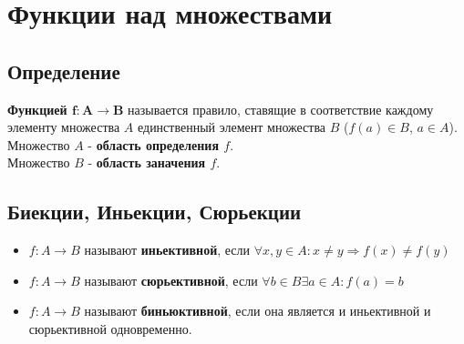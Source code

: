           
\chapter{Функции над множествами}
\section{Определение}
\textbf{Функцией $\mathbf{f : A \rightarrow B}$} называется правило, ставящие в соответствие каждому элементу множества $A$ единственный элемент множества $B$ ($f(a) \in B$, $a \in A$).\\
Множество $A$ - \textbf{область определения $f$}.\\
Множество $B$ - \textbf{область заначения $f$}.\\
\section{Биекции, Иньекции, Сюрьекции}
\begin{itemize}
	\item $f : A \rightarrow B$ называют \textbf{иньективной}, если $\forall x, y \in A : x \neq y \Rightarrow f(x) \neq f(y)$
	\item $f : A \rightarrow B$ называют \textbf{сюрьективной}, если $\forall b \in B \exists a \in A : f(a) = b$
	\item $f : A \rightarrow B$ называют \textbf{биньюктивной}, если она является и иньективной и сюрьективной одновременно. 
\end{itemize}
